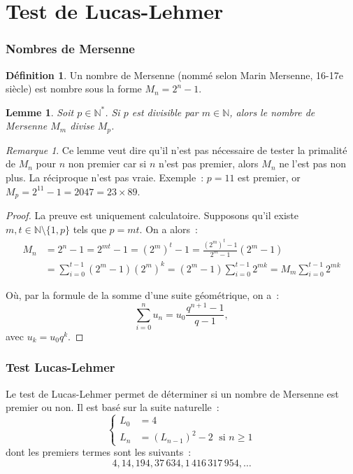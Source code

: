 \documentclass[10pt, mathserif]{beamer}
\newcommand{\N}{\mathbb N}
\newtheorem{lem}[thm]{Lemme}
\theoremstyle{definition}
\newtheorem{déf}[thm]{Définition}
\theoremstyle{remark}
\newtheorem*{rmq}{Remarque}
\begin{document}
\section{Test de Lucas-Lehmer}
	\begin{frame}
		\frametitle{Nombres de Mersenne}
		\begin{déf}
			Un nombre de Mersenne (nommé selon Marin Mersenne, 16-17e siècle) est nombre sous la forme $M_n = 2^n-1$.
		\end{déf}

		\begin{lem}
			Soit $p \in \N^*$. Si $p$ est divisible par $m \in \N$, alors le nombre de Mersenne $M_m$ divise $M_p$.
		\end{lem}

		\begin{rmq}
			Ce lemme veut dire qu'il n'est pas nécessaire de tester la primalité de $M_n$ pour $n$ non premier car si $n$ n'est pas premier, alors $M_n$ ne
			l'est pas non plus. La réciproque n'est pas vraie. Exemple~: $p = 11$ est premier, or $M_p = 2^{11}-1 = 2047 = 23 \times 89$.
		\end{rmq}
	\end{frame}

	\begin{frame}
		\begin{proof}
			La preuve est uniquement calculatoire. Supposons qu'il existe $m, t \in \N \setminus \{1, p\}$ tels que $p = mt$. On a alors~:
			\[\begin{aligned}
				M_n &= 2^n-1
				    = 2^{mt}-1
				    = \left(2^m\right)^t - 1
					= \frac {\left(2^m\right)^t - 1}{2^m - 1}\left(2^m - 1\right) \\
					&= \sum_{i=0}^{t-1}\left(2^m - 1\right)\left(2^m\right)^k
					= \left(2^m-1\right)\sum_{i=0}^{t-1}2^{mk}
					= M_m\sum_{i=0}^{t-1}2^{mk}
			\end{aligned}\]

			Où, par la formule de la somme d'une suite géométrique, on a~:
			\[\sum_{i=0}^{n}u_n = u_0\frac {q^{n+1}-1}{q-1},\]
			avec $u_k = u_0q^k$.
		\end{proof}
	\end{frame}

	\begin{frame}
		\frametitle{Test Lucas-Lehmer}
		Le test de Lucas-Lehmer permet de déterminer si un nombre de Mersenne est premier ou non. Il est basé sur la suite naturelle~:
		\[\begin{cases}
			L_0 &= 4 \\
			L_n &= (L_{n-1})^2 - 2 \;\text{ si } n \geq 1
		\end{cases}\]
		dont les premiers termes sont les suivants~:
		\[4, 14, 194, 37\,634, 1\,416\,317\,954, \ldots\]
	\end{frame}
\end{document}
